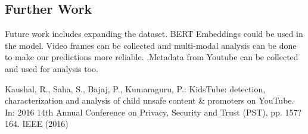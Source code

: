 \documentclass{article}[A4]
\begin{document}
\subsection{Further Work}
Future work includes expanding the dataset. BERT Embeddings could be used in the model. Video frames can be collected and multi-modal analysis can be done to make our predictions more reliable. \cite{Thomas_book}.Metadata from Youtube can be collected and used for analysis too. 

\begin{thebibliography}{unsrt}
    Kaushal, R., Saha, S., Bajaj, P., Kumaraguru, P.: KidsTube: detection, characterization and analysis of child unsafe content & promoters on YouTube. In: 2016 14th Annual Conference on Privacy, Security and Trust (PST), pp. 157?164. IEEE (2016) \end{thebibliography}
\end{document}
